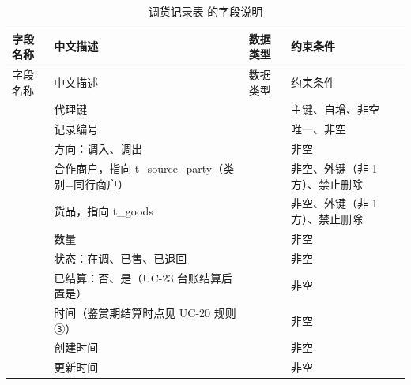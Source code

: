 \begin{longtable}{@{}L{3.5cm} L{4.1cm} L{2.9cm} L{4.0cm}@{}}
\caption{调货记录表  的字段说明}\label{tab:f-t-transfer}\\
\toprule
字段名称 & 中文描述 & 数据类型 & 约束条件 \\
\midrule
\endfirsthead
\toprule
字段名称 & 中文描述 & 数据类型 & 约束条件 \\
\midrule
\endhead
\bottomrule
\endlastfoot
{} & 代理键 &  & 主键、自增、非空 \\
 & 记录编号 &  & 唯一、非空 \\
 & 方向：调入、调出 &  & 非空 \\
 & 合作商户，指向 t\_source\_party（类别=同行商户） &  & 非空、外键（非 1 方）、禁止删除 \\
 & 货品，指向 t\_goods &  & 非空、外键（非 1 方）、禁止删除 \\
 & 数量 &  & 非空 \\
 & 状态：在调、已售、已退回 &  & 非空 \\
 & 已结算：否、是（UC-23 台账结算后置是） &  & 非空 \\
 & 时间（鉴赏期结算时点见 UC-20 规则③） &  & 非空 \\
 & 创建时间 &  & 非空 \\
 & 更新时间 &  & 非空 \\
\end{longtable}


